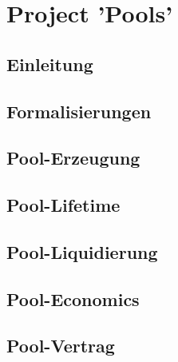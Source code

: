 
\section{Project 'Pools'}
\label{sec:pools}

\subsection{Einleitung}
\label{sec:pools-einleitung}
\vspace{0.3cm}


\subsection{Formalisierungen}
\vspace{0.3cm}


\subsection{Pool-Erzeugung}
\vspace{0.3cm}


\subsection{Pool-Lifetime}
\vspace{0.3cm}


\subsection{Pool-Liquidierung}
\vspace{0.3cm}


\subsection{Pool-Economics}
\vspace{0.3cm}


\subsection{Pool-Vertrag}
\vspace{0.3cm}


